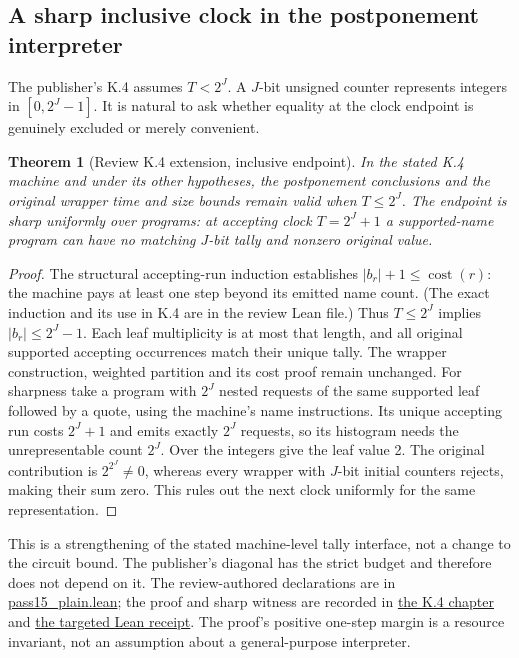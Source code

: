\documentclass[11pt,letterpaper]{article}
\newtheorem{theorem}{Theorem}[section]
\theoremstyle{definition}\newtheorem{definition}[theorem]{Definition}\newtheorem{example}[theorem]{Example}
\theoremstyle{remark}\newtheorem{remark}[theorem]{Remark}
\newcommand{\aud}[2]{\href{https://github.com/nousentllc/VP-VNP-Review/blob/567303d0bcf4f9d54390437b137752446e58ccd6/#1}{#2}}
\begin{document}
\subsection{A sharp inclusive clock in the postponement interpreter}\label{sec:clock}
The publisher's K.4 assumes $T<2^J$. A $J$-bit unsigned counter represents integers in $[0,2^J-1]$. It is natural to ask whether equality at the clock endpoint is genuinely excluded or merely convenient.
\begin{theorem}[Review K.4 extension, inclusive endpoint]\label{thm:clock}
In the stated K.4 machine and under its other hypotheses, the postponement conclusions and the original wrapper time and size bounds remain valid when $T\le2^J$. The endpoint is sharp uniformly over programs: at accepting clock $T=2^J+1$ a supported-name program can have no matching $J$-bit tally and nonzero original value.
\end{theorem}
\begin{proof}
The structural accepting-run induction establishes $|b_r|+1\le \operatorname{cost}(r)$: the machine pays at least one step beyond its emitted name count. (The exact induction and its use in K.4 are in the review Lean file.) Thus $T\le2^J$ implies $|b_r|\le2^J-1$. Each leaf multiplicity is at most that length, and all original supported accepting occurrences match their unique tally. The wrapper construction, weighted partition and its cost proof remain unchanged. For sharpness take a program with $2^J$ nested requests of the same supported leaf followed by a quote, using the machine's name instructions. Its unique accepting run costs $2^J+1$ and emits exactly $2^J$ requests, so its histogram needs the unrepresentable count $2^J$. Over the integers give the leaf value 2. The original contribution is $2^{2^J}\ne0$, whereas every wrapper with $J$-bit initial counters rejects, making their sum zero. This rules out the next clock uniformly for the same representation.
\end{proof}
This is a strengthening of the stated machine-level tally interface, not a change to the circuit bound. The publisher's diagonal has the strict budget and therefore does not depend on it. The review-authored declarations are in \aud{checks/pass15_plain.lean}{pass15\_plain.lean}; the proof and sharp witness are recorded in \aud{report/pass15-k4.tex}{the K.4 chapter} and \aud{checks/pass15_lean.json}{the targeted Lean receipt}. The proof's positive one-step margin is a resource invariant, not an assumption about a general-purpose interpreter.
\end{document}
